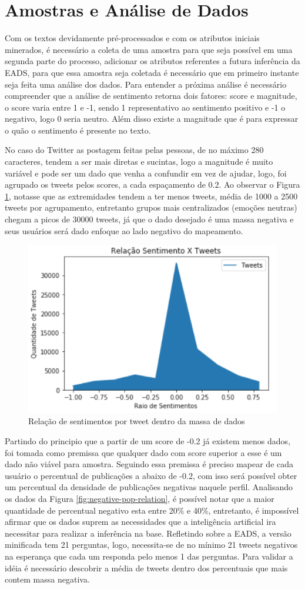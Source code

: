 \section{Amostras e Análise de Dados}
Com os textos devidamente pré-processados e com os atributos iniciais minerados, é necessário a coleta de uma amostra para que seja possível em uma segunda parte do processo, adicionar os atributos referentes a futura inferência da EADS, para que essa amostra seja coletada é necessário que em primeiro instante seja feita uma análise dos dados. Para entender a próxima análise é necessário compreender que a análise de sentimento retorna dois fatores: score e magnitude, o score varia entre 1 e -1, sendo 1 representativo ao sentimento positivo e -1 o negativo, logo 0 seria neutro. Além disso existe a magnitude que é para expressar o quão o sentimento é presente no texto. 

No caso do Twitter as postagem feitas pelas pessoas, de no máximo 280 caracteres, tendem a ser mais diretas e sucintas, logo a magnitude é muito variável e pode ser um dado que venha a confundir em vez de ajudar, logo, foi agrupado os tweets pelos scores, a cada espaçamento de 0.2. Ao observar o Figura \ref{fig:sentiment-relation}, notasse que as extremidades tendem a ter menos tweets, média de 1000 a 2500 tweets por agrupamento, entretanto grupos mais centralizados (emoções neutras) chegam a picos de 30000 tweets, já que o dado desejado é uma massa negativa e seus usuários será dado enfoque ao lado negativo do mapeamento.

\begin{figure}[!ht]
    \centering
    \includegraphics[width=.4\textwidth]{imagens/relacao-sentimento.png}
    \caption{Relação de sentimentos por tweet dentro da massa de dados}
    \label{fig:sentiment-relation}
\end{figure}


Partindo do principio que a partir de um score de -0.2 já existem menos dados, foi tomada como premissa que qualquer dado com score superior a esse é um dado não viável para amostra. Seguindo essa premissa é preciso mapear de cada usuário o percentual de publicações a abaixo de -0.2, com isso será possível obter um percentual da densidade de publicações negativas naquele perfil. Analisando os dados da Figura \ref{fig:negative-pop-relation}, é possível notar que a maior quantidade de percentual negativo esta entre 20\% e 40\%, entretanto, é impossível afirmar que os dados suprem as necessidades que a inteligência artificial ira necessitar para realizar a inferência na base. Refletindo sobre a EADS, a versão minificada tem 21 perguntas, logo, necessita-se de no mínimo 21 tweets negativos na esperança que cada um responda pelo menos 1 das perguntas. Para validar a idéia é necessário descobrir a média de tweets dentro dos percentuais que mais contem massa negativa.

